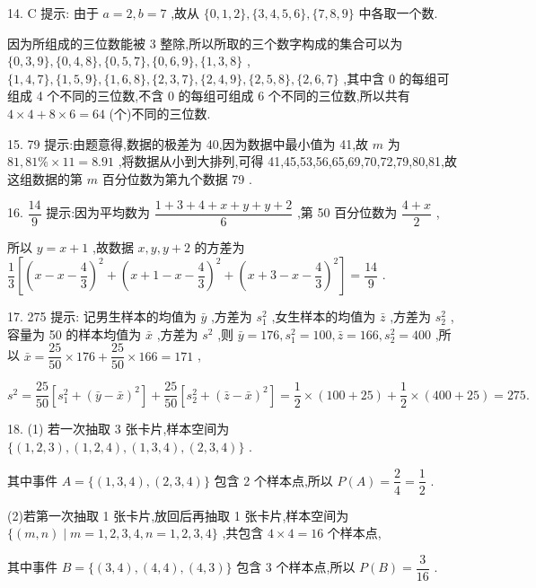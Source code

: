 14. C 提示: 由于 $a = 2,b = 7$ ,故从 $\{ 0,1,2\} ,\{ 3,4,5,6\} ,\{ 7,8,9\}$ 中各取一个数.

因为所组成的三位数能被 3 整除,所以所取的三个数字构成的集合可以为 $\{ 0,3,9\} ,\{ 0,4,8\} ,\{ 0,5,7\} ,\{ 0,6,9\} ,\{ 1,3,8\}$ , $\{ 1,4,7\} ,\{ 1,5,9\} ,\{ 1,6,8\} ,\{ 2,3,7\} ,\{ 2,4,9\} ,\{ 2,5,8\} ,\{ 2,6,7\}$ ,其中含 0 的每组可组成 4 个不同的三位数,不含 0 的每组可组成 6 个不同的三位数,所以共有 $4 \times  4 + 8 \times  6 = {64}$ (个)不同的三位数.

15. 79 提示:由题意得,数据的极差为 40,因为数据中最小值为 41,故 $m$ 为 ${81},{81}\%  \times  {11} = {8.91}$ ,将数据从小到大排列,可得 41,45,53,56,65,69,70,72,79,80,81,故这组数据的第 $m$ 百分位数为第九个数据 79 .

16. $\dfrac{14}{9}$ 提示:因为平均数为 $\dfrac{1 + 3 + 4 + x + y + y + 2}{6}$ ,第 50 百分位数为 $\dfrac{4 + x}{2}$ ,

所以 $y = x + 1$ ,故数据 $x,y,y + 2$ 的方差为 $\dfrac{1}{3}\left\lbrack  {{\left( x - x - \dfrac{4}{3}\right) }^{2} + {\left( x + 1 - x - \dfrac{4}{3}\right) }^{2} + {\left( x + 3 - x - \dfrac{4}{3}\right) }^{2}}\right\rbrack   = \dfrac{14}{9}$ .

17. 275 提示: 记男生样本的均值为 $\bar{y}$ ,方差为 ${s}_{1}^{2}$ ,女生样本的均值为 $\bar{z}$ ,方差为 ${s}_{2}^{2}$ ,容量为 50 的样本均值为 $\bar{x}$ ,方差为 ${s}^{2}$ ,则 $\bar{y} = {176},{s}_{1}^{2} = {100},\bar{z} = {166},{s}_{2}^{2} = {400}$ ,所以 $\bar{x} = \dfrac{25}{50} \times  {176} + \dfrac{25}{50} \times  {166} = {171}$ ,

${s}^{2} = \dfrac{25}{50}\left\lbrack  {{s}_{1}^{2} + {\left( \bar{y} - \bar{x}\right) }^{2}}\right\rbrack   + \dfrac{25}{50}\left\lbrack  {{s}_{2}^{2} + {\left( \bar{z} - \bar{x}\right) }^{2}}\right\rbrack   = \dfrac{1}{2} \times  \left( {{100} + {25}}\right)  + \dfrac{1}{2} \times  \left( {{400} + {25}}\right)  = {275}.$

18. (1) 若一次抽取 3 张卡片,样本空间为 $\{ \left( {1,2,3}\right) ,\left( {1,2,4}\right) ,\left( {1,3,4}\right) ,\left( {2,3,4}\right) \}$ .

其中事件 $A = \{ \left( {1,3,4}\right) ,\left( {2,3,4}\right) \}$ 包含 2 个样本点,所以 $P\left( A\right)  = \dfrac{2}{4} = \dfrac{1}{2}$ .

(2)若第一次抽取 1 张卡片,放回后再抽取 1 张卡片,样本空间为 $\{ \left( {m,n}\right)  \mid  m = 1,2,3,4,n = 1,2,3,4\}$ ,共包含 $4 \times  4 = {16}$ 个样本点,

其中事件 $B = \{ \left( {3,4}\right) ,\left( {4,4}\right) ,\left( {4,3}\right) \}$ 包含 3 个样本点,所以 $P\left( B\right)  = \dfrac{3}{16}$ .

